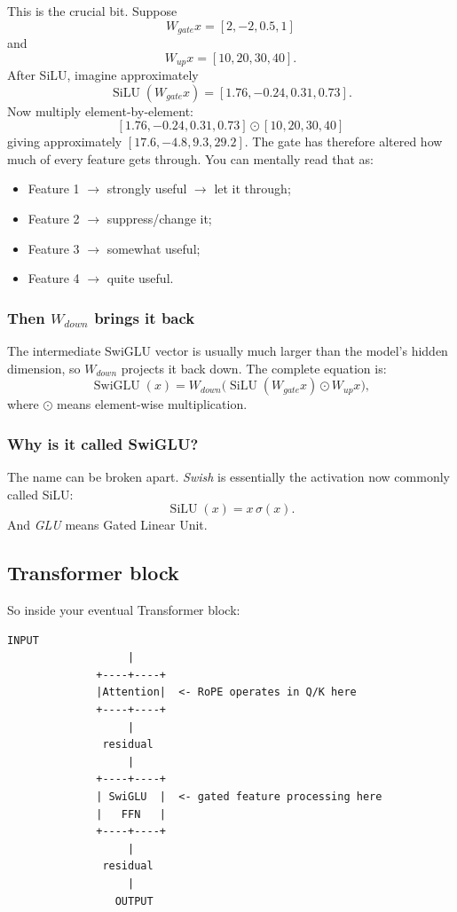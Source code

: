 This is the crucial bit. Suppose
\[
  W_{gate}x=[2,-2,0.5,1]
\]
and
\[
  W_{up}x=[10,20,30,40].
\]
After SiLU, imagine approximately
\[
  \operatorname{SiLU}(W_{gate}x)=[1.76,-0.24,0.31,0.73].
\]
Now multiply element-by-element:
\[
  [1.76,-0.24,0.31,0.73]\odot[10,20,30,40]
\]
giving approximately \([17.6,-4.8,9.3,29.2]\). The gate has therefore altered
how much of every feature gets through. You can mentally read that as:
\begin{itemize}
    \setlength{\itemsep}{0pt}
  \item Feature 1 $\rightarrow$ strongly useful $\rightarrow$ let it through;
  \item Feature 2 $\rightarrow$ suppress/change it;
  \item Feature 3 $\rightarrow$ somewhat useful;
  \item Feature 4 $\rightarrow$ quite useful.
\end{itemize}

\subsubsection{Then \(W_{down}\) brings it back}

The intermediate SwiGLU vector is usually much larger than the model's hidden
dimension, so \(W_{down}\) projects it back down. The complete equation is:
\[
  \operatorname{SwiGLU}(x)
  =W_{down}\bigl(\operatorname{SiLU}(W_{gate}x)\odot W_{up}x\bigr),
\]
where \(\odot\) means element-wise multiplication.

\subsubsection{Why is it called SwiGLU?}

The name can be broken apart. \emph{Swish} is essentially the activation now
commonly called SiLU:
\[
  \operatorname{SiLU}(x)=x\,\sigma(x).
\]
And \emph{GLU} means Gated Linear Unit.

\subsection{Transformer block}

So inside your eventual Transformer block:
\begin{lstlisting}[style=shadedpython,language={},basicstyle=\scriptsize\ttfamily]
                 INPUT
                   |
              +----+----+
              |Attention|  <- RoPE operates in Q/K here
              +----+----+
                   |
               residual
                   |
              +----+----+
              | SwiGLU  |  <- gated feature processing here
              |   FFN   |
              +----+----+
                   |
               residual
                   |
                 OUTPUT
\end{lstlisting}

